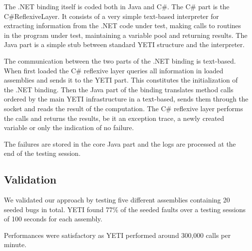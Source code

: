 The .NET binding itself is coded both in Java and C\#. The C\# part is the C\#ReflexiveLayer. It consists of a very simple text-based interpreter for extracting information from the .NET code under test, making calls to routines in the program under test, maintaining a variable pool and returning results. The Java part is a simple stub between standard YETI structure and the interpreter. 

The communication between the two parts of the .NET binding is text-based.
When first loaded the C\# reflexive layer queries all information in loaded assemblies and sends it to the YETI part. This constitutes the initialization of the .NET binding.
Then the Java part of the binding translates method calls ordered
by the main YETI infrastructure in a text-based, sends them through the socket 
and reads the result of the computation. The C\# reflexive layer performs the calls 
and returns the results, be it an exception trace, a newly created variable or only the indication of no failure.

The failures are stored in the core Java part and the logs are processed at the end of the testing session.

\subsection{Validation}
We validated our approach by testing five different assemblies containing 20 seeded bugs in total.
YETI found 77\% of the seeded faults over a testing sessions of 100 seconds for each assembly.

Performances were satisfactory as YETI performed around 300,000 calls per minute.
